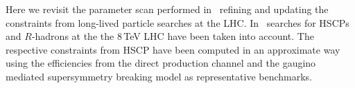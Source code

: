 \documentclass[preprint,number,sort&compress,twocolumn,3p]{elsstyarticle}
\newcommand{\com}[1]{\emph{\color{red}[#1]}}  %
\begin{document}



Here we revisit the parameter scan performed in~\cite{Heisig:2013rya,Heisig:2013sva} refining and updating the 
constraints from long-lived particle searches at the LHC\@. In~\cite{Heisig:2013rya} searches for HSCPs and 
$R$-hadrons at the the 8\,TeV LHC have been taken into account. The respective constraints from HSCP
have been computed in an approximate way using the efficiencies from the direct production channel and
the gaugino mediated supersymmetry breaking model as representative benchmarks. 
%

%
%
\end{document}
